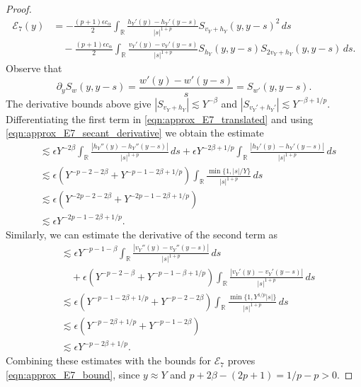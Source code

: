 \documentclass[11pt]{amsart}
\theoremstyle{definition}
\theoremstyle{remark}
\numberwithin{equation}{section}
\newcommand{\R}{\mathbb{R}}
\newcommand{\mc}[1]{\mathcal{#1}}
\begin{document}
\begin{proof}
\begin{equation}
        \begin{aligned}
            \mc{E}_7(y) & = -\frac{(p+1)\epsilon c_\alpha}{2}\int_{\R}\frac{h_Y'(y)-h_Y'(y-s)}{|s|^{1+p}}S_{v_Y+h_Y}(y,y-s)^2\,ds \\
            & \quad -\frac{(p+1)\epsilon c_\alpha}{2}\int_{\R}\frac{v_Y'(y)-v_Y'(y-s)}{|s|^{1+p}}S_{h_Y}(y,y-s)S_{2v_Y+h_Y}(y,y-s)\,ds.
        \end{aligned}
    \end{equation}
    Observe that
    \begin{equation}\label{eqn:approx_E7_secant_derivative}
        \partial_y S_w(y,y-s)=\frac{w'(y)-w'(y-s)}{s}=S_{w'}(y,y-s).
    \end{equation}
    The derivative bounds above give $|S_{v_Y+h_Y}|\lesssim Y^{-\beta}$ and $|S_{v_Y'+h_Y'}|\lesssim Y^{-\beta+1/p}$. Differentiating the first term in \eqref{eqn:approx_E7_translated} and using \eqref{eqn:approx_E7_secant_derivative} we obtain the estimate
    \begin{align*}
        &\lesssim \epsilon Y^{-2\beta}\int_{\R}\frac{|h_Y''(y)-h_Y''(y-s)|}{|s|^{1+p}}\,ds
        +\epsilon Y^{-2\beta+1/p}\int_{\R}\frac{|h_Y'(y)-h_Y'(y-s)|}{|s|^{1+p}}\,ds\\
        &\lesssim \epsilon\left(Y^{-p-2-2\beta}+Y^{-p-1-2\beta+1/p}\right)\int_{\R}\frac{\min\{1,|s|/Y\}}{|s|^{1+p}}\,ds\\
        &\lesssim \epsilon\left(Y^{-2p-2-2\beta}+Y^{-2p-1-2\beta+1/p}\right)\\
        &\lesssim \epsilon Y^{-2p-1-2\beta+1/p}.
    \end{align*}
    Similarly, we can estimate the derivative of the second term as
    \begin{align*}
        &\lesssim \epsilon Y^{-p-1-\beta}\int_{\R}\frac{|v_Y''(y)-v_Y''(y-s)|}{|s|^{1+p}}\,ds\\
        &\quad +\epsilon\left(Y^{-p-2-\beta}+Y^{-p-1-\beta+1/p}\right)\int_{\R}\frac{|v_Y'(y)-v_Y'(y-s)|}{|s|^{1+p}}\,ds\\
        &\lesssim \epsilon\left(Y^{-p-1-2\beta+1/p}+Y^{-p-2-2\beta}\right)\int_{\R}\frac{\min\{1,Y^{1/p}|s|\}}{|s|^{1+p}}\,ds\\
        &\lesssim \epsilon\left(Y^{-p-2\beta+1/p}+Y^{-p-1-2\beta}\right)\\
        &\lesssim \epsilon Y^{-p-2\beta+1/p}.
    \end{align*}
    Combining these estimates with the bounds for $\mc{E}_7$ proves \eqref{eqn:approx_E7_bound}, since $y\approx Y$ and $p+2\beta-(2p+1)=1/p-p>0$.
\end{proof}
\end{document}

